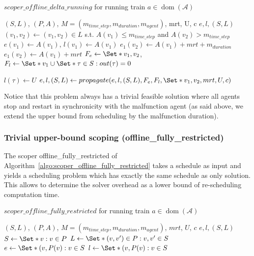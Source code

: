 \documentclass{article}
\DeclareMathOperator{\dom}{dom}
\begin{document}
\begin{algorithm}
	\caption{$scoper\_offline\_delta\_running$ for running train $a \in \dom(\mathcal{A})$} \label{algo:scoper_offline_delta_running}
	\begin{algorithmic}[1]
		\Require $(S,L)$, $(P,A)$, $M=(m_{time\_step},m_{duration},m_{agent})$, mrt, U, c
	    \Ensure $e,l,(S,L)$
	    \State $(v_1,v_2) \leftarrow (v_1,v_2) \in L$ s.t. $A(v_1)\leq m_{time\_step}$ and $A(v_2)>m_{time\_step}$
		\State $e(v_1)\leftarrow A(v_1)$, $l(v_1) \leftarrow A(v_1)$
            \State $e_1(v_2) \leftarrow A(v_1)+mrt+m_{duration}$
        \Else
            \State $e_1(v_2) \leftarrow A(v_1)+mrt$
        \EndIf
        \State $F_e \leftarrow \Set*{v_1,v_2}$, $F_l \leftarrow \Set*{v_1} \cup \Set*{\tau \in S: out(\tau)=0}$

	        \State $l(\tau) \leftarrow U$
	    \EndFor
		\State $e,l,(S,L) \leftarrow propagate(e,l,(S,L),F_e,F_l, \Set*{v_1,v_2}, mrt, U, c)$
	\end{algorithmic}
\end{algorithm}


Notice that this problem always has a trivial feasible solution where all agents stop and restart in synchronicity with the malfunction agent (as said above, we extend the upper bound from scheduling by the malfunction duration).


\subsubsection{Trivial upper-bound scoping (offline\_fully\_restricted)}
\label{subsubsec:scope_fully_restricted}

The scoper offline\_fully\_restricted of Algorithm~\ref{algo:scoper_offline_fully_restricted} takes a schedule as input and yields a scheduling problem which has exactly the same schedule as only solution. This allows to determine the solver overhead as a lower bound of re-scheduling computation time.



\begin{algorithm}
	\caption{$scoper\_offline\_fully\_restricted$ for running train $a \in \dom(\mathcal{A})$} \label{algo:scoper_offline_fully_restricted}
	\begin{algorithmic}[1]
		\Require $(S,L)$, $(P,A)$, $M=(m_{time\_step},m_{duration},m_{agent})$, $mrt$, $U$, $c$
	    \Ensure $e,l,(S,L)$
        \State $S \leftarrow \Set*{v: v\in P}$
        \State $L \leftarrow \Set*{(v,v^\prime) \in P: v,v^\prime \in S}$
        \State $e \leftarrow \Set*{(v,P(v): v\in S}$
        \State $l \leftarrow \Set*{(v,P(v): v\in S}$
	\end{algorithmic}
\end{algorithm}
\end{document}
